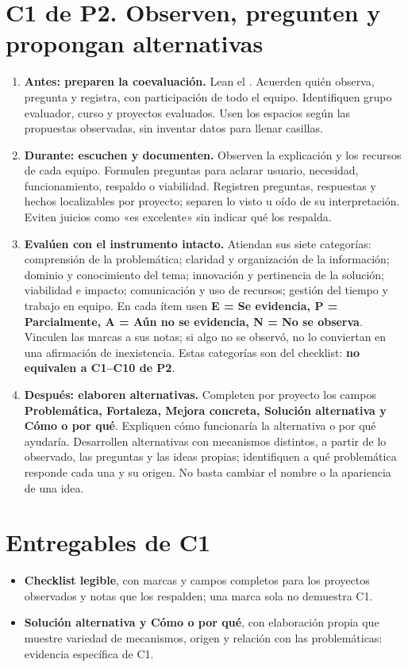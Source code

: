 \section*{C1 de P2. Observen, pregunten y propongan alternativas}
\begin{enumerate}[series=pasos]
\item \textbf{Antes: preparen la coevaluación.} Lean el . Acuerden quién observa, pregunta y registra, con participación de todo el equipo. Identifiquen grupo evaluador, curso y proyectos evaluados. Usen los espacios según las propuestas observadas, sin inventar datos para llenar casillas.
\item \textbf{Durante: escuchen y documenten.} Observen la explicación y los recursos de cada equipo. Formulen preguntas para aclarar usuario, necesidad, funcionamiento, respaldo o viabilidad. Registren preguntas, respuestas y hechos localizables por proyecto; separen lo visto u oído de su interpretación. Eviten juicios como «es excelente» sin indicar qué los respalda.
\item \textbf{Evalúen con el instrumento intacto.} Atiendan sus siete categorías: comprensión de la problemática; claridad y organización de la información; dominio y conocimiento del tema; innovación y pertinencia de la solución; viabilidad e impacto; comunicación y uso de recursos; gestión del tiempo y trabajo en equipo. En cada ítem usen \textbf{E = Se evidencia, P = Parcialmente, A = Aún no se evidencia, N = No se observa}. Vinculen las marcas a sus notas; si algo no se observó, no lo conviertan en una afirmación de inexistencia. Estas categorías son del checklist: \textbf{no equivalen a C1--C10 de P2}.
\item \textbf{Después: elaboren alternativas.} Completen por proyecto los campos \textbf{Problemática, Fortaleza, Mejora concreta, Solución alternativa y Cómo o por qué}. Expliquen cómo funcionaría la alternativa o por qué ayudaría. Desarrollen alternativas con mecanismos distintos, a partir de lo observado, las preguntas y las ideas propias; identifiquen a qué problemática responde cada una y su origen. No basta cambiar el nombre o la apariencia de una idea.
\end{enumerate}

\section*{Entregables de C1}
\begin{itemize}
\item \textbf{Checklist legible}, con marcas y campos completos para los proyectos observados y notas que los respalden; una marca sola no demuestra C1.
\item \textbf{Solución alternativa y Cómo o por qué}, con elaboración propia que muestre variedad de mecanismos, origen y relación con las problemáticas: evidencia específica de C1.
\end{itemize}

